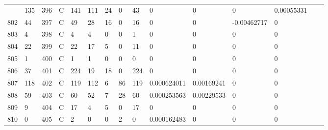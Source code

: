 \begin{longtable}{lllllllllllllll}
\begin{comment}
	801 & 135               & 396 & C   & 141               & 111               & 24                & 0    & 43         & 0              & 0              & 0             & 0.00055331   \\
	802 & 44                & 397 & C   & 49                & 28                & 16                & 0    & 16         & 0              & 0              & -0.00462717   & 0            \\
	803 & 4                 & 398 & C   & 4                 & 4                 & 0                 & 0    & 1          & 0              & 0              & 0             & 0            \\
	804 & 22                & 399 & C   & 22                & 17                & 5                 & 0    & 11         & 0              & 0              & 0             & 0            \\
	805 & 1                 & 400 & C   & 1                 & 1                 & 0                 & 0    & 0          & 0              & 0              & 0             & 0            \\
	806 & 37                & 401 & C   & 224               & 19                & 18                & 0    & 224        & 0              & 0              & 0             & 0            \\
	807 & 118               & 402 & C   & 119               & 112               & 6                 & 86   & 119        & 0.000624011    & 0.00169241     & 0             & 0            \\
	808 & 59                & 403 & C   & 60                & 52                & 7                 & 28   & 60         & 0.000253563    & 0.00229533     & 0             & 0            \\
	809 & 9                 & 404 & C   & 17                & 4                 & 5                 & 0    & 17         & 0              & 0              & 0             & 0            \\
	810 & 0                 & 405 & C   & 2                 & 0                 & 0                 & 2    & 0          & 0.000162483    & 0              & 0             & 0       
\end{comment}    
\end{longtable}